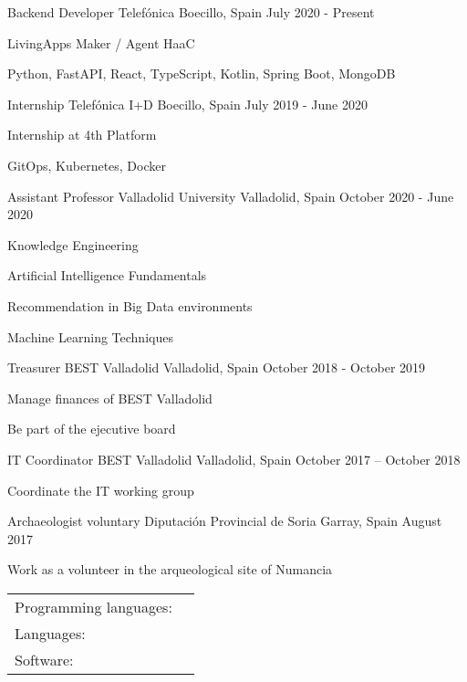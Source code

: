 \documentclass[]{awesome-cv}
\begin{document}
\vspace{-2mm}
\begin{cventries}
	\cventry
	{Backend Developer}
	{Telefónica}
	{Boecillo, Spain}
	{July 2020 - Present}
	{\begin{cvitems}
		\item {LivingApps Maker / Agent HaaC}
		\item {Python, FastAPI, React, TypeScript, Kotlin, Spring Boot, MongoDB}
	\end{cvitems}}
	\cventry
	{Internship}
	{Telefónica I+D}
	{Boecillo, Spain}
	{July 2019 - June 2020}
	{\begin{cvitems}
		\item {Internship at 4th Platform}
		\item {GitOps, Kubernetes, Docker}
	\end{cvitems}
	}
	\cventry
	{Assistant Professor}
	{Valladolid University}
	{Valladolid, Spain}
	{October 2020 - June 2020}
	{\begin{cvitems}
		\item {Knowledge Engineering}
		\item {Artificial Intelligence Fundamentals}
		\item {Recommendation in Big Data environments}
		\item {Machine Learning Techniques}
	\end{cvitems}}
	\cventry
	{Treasurer}
	{BEST Valladolid}
	{Valladolid, Spain}
	{October 2018 - October 2019}
	{\begin{cvitems}
		\item {Manage finances of BEST Valladolid}
		\item {Be part of the ejecutive board}
		\end{cvitems}}
	\cventry
	{IT Coordinator}
	{BEST Valladolid}
	{Valladolid, Spain}
	{October 2017 – October 2018}
	{\begin{cvitems}
		\item {Coordinate the IT working group}
		\end{cvitems}}
	\cventry
	{Archaeologist voluntary}
	{Diputación Provincial de Soria}
	{Garray, Spain}
	{August 2017}
	{\begin{cvitems}
		\item {Work as a volunteer in the arqueological site of Numancia}
		\end{cvitems}}
\end{cventries}
\begin{cventries}
	\cventry
	{}
	{\def\arraystretch{1.15}{\begin{tabular}{ l l }
		Programming languages:  & {\skill{ Rust, C, Python, Java, JavaScript, SQL, Prolog, Kotlin}} \\
		Languages:  & {\skill{ Spanish (native), English ( FIRST B2)}} \\
		Software: & {\skill{Linux, Kubernetes, Docker, Azure, AWS, \LaTeX , PostgreSQL, Microsoft Office, Git}} \\
		\end{tabular}}}
	{}
	{}
	{}
\end{cventries}
\end{document}
